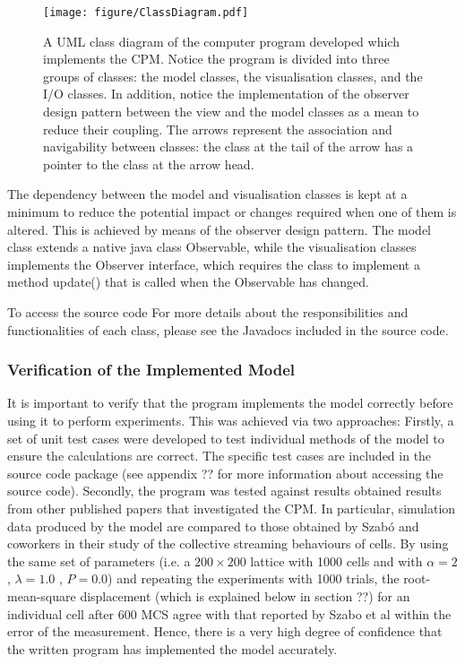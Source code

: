 \documentclass[a4paper,12pt]{article}
\begin{document}
\begin{figure}[h]
\texttt{[image: figure/ClassDiagram.pdf]}
\caption{A UML class diagram of the computer program developed which implements the CPM. Notice the program is divided into three groups of classes: the model classes, the visualisation classes, and the I/O classes. In addition, notice the implementation of the observer design pattern between the view and the model classes as a mean to reduce their coupling. The arrows represent the association and navigability between classes: the class at the tail of the arrow has a pointer to the class at the arrow head.}
\label{fig:ClassDiagram}
\end{figure}

The dependency between the model and visualisation classes is kept at a minimum to reduce the potential impact or changes required when one of them is altered. This is achieved by means of the observer design pattern. The model class extends a native java class Observable, while the visualisation classes implements the Observer interface, which requires the class to implement a method update() that is called when the Observable has changed.

To access the source code
For more details about the responsibilities and functionalities of each class, please see the Javadocs included in the source code. 

\subsubsection{Verification of the Implemented Model}
It is important to verify that the program implements the model correctly before using it to perform experiments. This was achieved via two approaches: Firstly, a set of unit test cases were developed to test individual methods of the model to ensure the calculations are correct. The specific test cases are included in the source code package (see appendix ?? for more information about accessing the source code). Secondly, the program was tested against results obtained results from other published papers that investigated the CPM. In particular, simulation data produced by the model are compared to those obtained by Szab\'o and coworkers in their study of the collective streaming behaviours of cells. By using the same set of parameters (i.e. a $200 \times 200$ lattice with 1000 cells and with $\alpha = 2$, $\lambda = 1.0$ , $P = 0.0$) and repeating the experiments with 1000 trials, the root-mean-square displacement (which is explained below in section ??) for an individual cell after 600 MCS agree with that reported by Szabo et al within the error of the measurement. Hence, there is a very high degree of confidence that the written program has implemented the model accurately.
\end{document}
